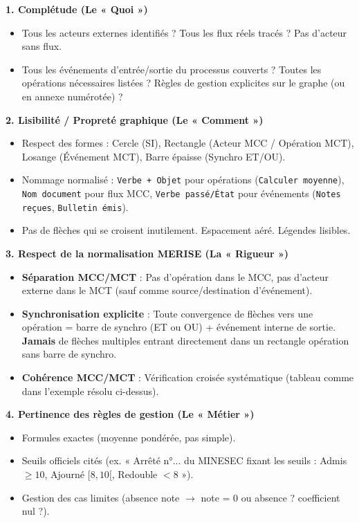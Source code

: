 \documentclass[11pt]{article}
\begin{document}
\begin{aretenir}
\textbf{1. Complétude (Le « Quoi »)}
\begin{itemize}
    \item [MCC] Tous les acteurs externes identifiés ? Tous les flux réels tracés ? Pas d'acteur sans flux.
    \item [MCT] Tous les événements d'entrée/sortie du processus couverts ? Toutes les opérations nécessaires listées ? Règles de gestion explicites sur le graphe (ou en annexe numérotée) ?
\end{itemize}

\textbf{2. Lisibilité / Propreté graphique (Le « Comment »)}
\begin{itemize}
    \item Respect des formes : Cercle (SI), Rectangle (Acteur MCC / Opération MCT), Losange (Événement MCT), Barre épaisse (Synchro ET/OU).
    \item Nommage normalisé : \texttt{Verbe + Objet} pour opérations (\texttt{Calculer moyenne}), \texttt{Nom document} pour flux MCC, \texttt{Verbe passé/État} pour événements (\texttt{Notes reçues}, \texttt{Bulletin émis}).
    \item Pas de flèches qui se croisent inutilement. Espacement aéré. Légendes lisibles.
\end{itemize}

\textbf{3. Respect de la normalisation MERISE (La « Rigueur »)}
\begin{itemize}
    \item \textbf{Séparation MCC/MCT} : Pas d'opération dans le MCC, pas d'acteur externe dans le MCT (sauf comme source/destination d'événement).
    \item \textbf{Synchronisation explicite} : Toute convergence de flèches vers une opération = barre de synchro (ET ou OU) + événement interne de sortie. \textbf{Jamais} de flèches multiples entrant directement dans un rectangle opération sans barre de synchro.
    \item \textbf{Cohérence MCC/MCT} : Vérification croisée systématique (tableau comme dans l'exemple résolu ci-dessus).
\end{itemize}

\textbf{4. Pertinence des règles de gestion (Le « Métier »)}
\begin{itemize}
    \item Formules exactes (moyenne pondérée, pas simple).
    \item Seuils officiels cités (ex. « Arrêté n°... du MINESEC fixant les seuils : Admis $\ge 10$, Ajourné $[8, 10[$, Redouble $< 8$ »).
    \item Gestion des cas limites (absence note $\rightarrow$ note = 0 ou absence ? coefficient nul ?).
\end{itemize}
\end{aretenir}
\end{document}
